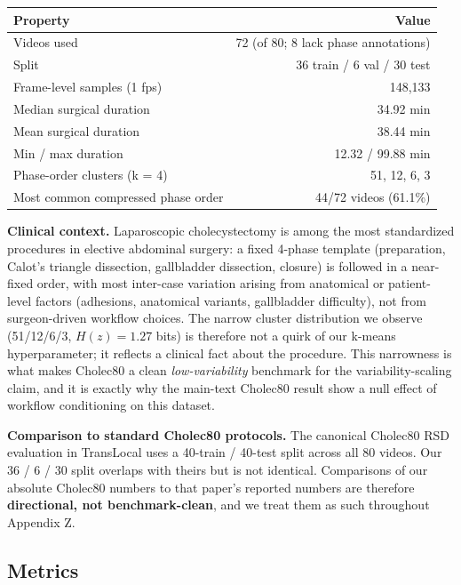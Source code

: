 \begin{longtable}[]{@{}lr@{}}
\toprule\noalign{}
Property & Value \\
\midrule\noalign{}
\endhead
\bottomrule\noalign{}
\endlastfoot
Videos used & 72 (of 80; 8 lack phase annotations) \\
Split & 36 train / 6 val / 30 test \\
Frame-level samples (1 fps) & 148,133 \\
Median surgical duration & 34.92 min \\
Mean surgical duration & 38.44 min \\
Min / max duration & 12.32 / 99.88 min \\
Phase-order clusters (k = 4) & 51, 12, 6, 3 \\
Most common compressed phase order & 44/72 videos (61.1\%) \\
\end{longtable}

\textbf{Clinical context.} Laparoscopic cholecystectomy is among the
most standardized procedures in elective abdominal surgery: a fixed
4-phase template (preparation, Calot's triangle dissection, gallbladder
dissection, closure) is followed in a near-fixed order, with most
inter-case variation arising from anatomical or patient-level factors
(adhesions, anatomical variants, gallbladder difficulty), not from
surgeon-driven workflow choices. The narrow cluster distribution we
observe (51/12/6/3, \(H(z) = 1.27\) bits) is therefore not a quirk of
our k-means hyperparameter; it reflects a clinical fact about the
procedure. This narrowness is what makes Cholec80 a clean
\emph{low-variability} benchmark for the variability-scaling claim, and
it is exactly why the main-text Cholec80 result show a null effect of workflow
conditioning on this dataset.

\textbf{Comparison to standard Cholec80 protocols.} The canonical
Cholec80 RSD evaluation in TransLocal \citep{loukas2024translocal} uses a
40-train / 40-test split across all 80 videos. Our 36 / 6 / 30 split
overlaps with theirs but is not identical. Comparisons of our absolute
Cholec80 numbers to that paper's reported numbers are therefore
\textbf{directional, not benchmark-clean}, and we treat them as such
throughout Appendix Z.

\subsection{Metrics}\label{metrics}

